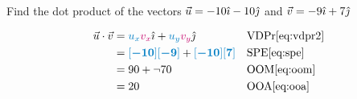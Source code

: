 \begin{example}[id:20141214-194701] \label{20141214-194701} \hfill \\

Find the dot product of the vectors $\vec{u}=-10\hat{\imath} - 10 \hat{\jmath}$ and $\vec{v}=-9\hat{\imath} + 7 \hat{\jmath}$

\soln
\solnsteps
\begin{align*}
\vec{u} \cdot \vec{v} & = \cBlue{u_x}\cRed{v_x} \ihat + \cBlue{u_y}\cRed{v_y} \jhat && \text{VDPr} \eqref{eq:vdpr2} \\
&= \farg{-10}\farg{-9}+ \farg{-10}\farg{7} && \text{SPE} \eqref{eq:spe} \\
&= 90+\neg 70 && \text{OOM} \eqref{eq:oom} \\
&= 20 && \text{OOA} \eqref{eq:ooa} 
\end{align*}


\end{example}
